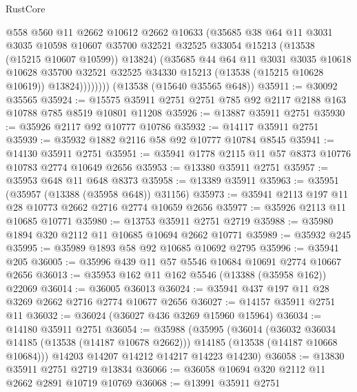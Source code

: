 \begin{lexlean}{RustCore}
\begin{coremodule}
                  @558
                  @560
                  @11
                  @2662
                  @10612
                  @2662
                  @10633
                  (@35685
                    @38
                    @64
                    @11
                    @3031
                    @3035
                    @10598
                    @10607
                    @35700
                    @32521
                    @32525
                    @33054
                    @15213
                    (@13538 (@15215 @10607 @10599))
                    @13824)
                  (@35685
                    @44
                    @64
                    @11
                    @3031
                    @3035
                    @10618
                    @10628
                    @35700
                    @32521
                    @32525
                    @34330
                    @15213
                    (@13538 (@15215 @10628 @10619))
                    @13824))))))))
    (@13538 (@15640 @35565 @648))
@35911 := @30092 @35565
@35924 := @15575 @35911 @2751 @2751 @785 @92 @2117 @2188 @163 @10788 @785 @8519 @10801 @11208
@35926 := @13887 @35911 @2751
@35930 := @35926 @2117 @92 @10777 @10786
@35932 := @14117 @35911 @2751
@35939 := @35932 @1882 @2116 @58 @92 @10777 @10784 @8545
@35941 := @14130 @35911 @2751
@35951 := @35941 @1778 @2115 @11 @57 @8373 @10776 @10783 @2774 @10649 @2656
@35953 := @13380 @35911 @2751
@35957 := @35953 @648 @11 @648 @8373
@35958 := @13389 @35911
@35963 := @35951 (@35957 (@13388 (@35958 @648)) @31156)
@35973 := @35941 @2113 @197 @11 @28 @10773 @2662 @2716 @2774 @10659 @2656
@35977 := @35926 @2113 @11 @10685 @10771
@35980 := @13753 @35911 @2751 @2719
@35988 := @35980 @1894 @320 @2112 @11 @10685 @10694 @2662 @10771
@35989 := @35932 @245
@35995 := @35989 @1893 @58 @92 @10685 @10692 @2795
@35996 := @35941 @205
@36005 := @35996 @439 @11 @57 @5546 @10684 @10691 @2774 @10667 @2656
@36013 := @35953 @162 @11 @162 @5546 (@13388 (@35958 @162)) @22069
@36014 := @36005 @36013
@36024 := @35941 @437 @197 @11 @28 @3269 @2662 @2716 @2774 @10677 @2656
@36027 := @14157 @35911 @2751 @11
@36032 := @36024 (@36027 @436 @3269 @15960 @15964)
@36034 := @14180 @35911 @2751
@36054 := @35988
    (@35995
      (@36014
        (@36032 @36034 @14185 (@13538 (@14187 @10678 @2662)))
        @14185
        (@13538 (@14187 @10668 @10684)))
      @14203
      @14207
      @14212
      @14217
      @14223
      @14230)
@36058 := @13830 @35911 @2751 @2719 @13834
@36066 := @36058 @10694 @320 @2112 @11 @2662 @2891 @10719 @10769
@36068 := @13991 @35911 @2751

\end{coremodule}
\end{lexlean}
